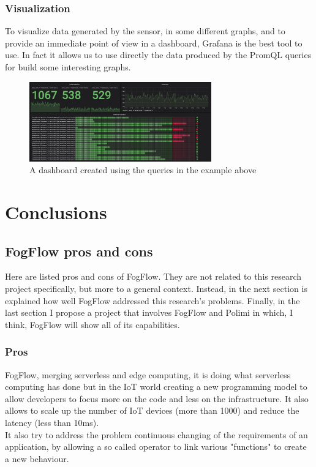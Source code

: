 \documentclass[a4paper]{article}
\begin{document}
\subsubsection{Visualization}
To visualize data generated by the sensor, in some different graphs, and to provide an immediate point of view in a dashboard, Grafana is the best tool to use.
In fact it allows us to use directly the data produced by the PromQL queries for build some interesting graphs.
\begin{figure}[H]
    \centering
    \includegraphics[width=0.7\textwidth]{Images/grafana.png}
    \caption{A dashboard created using the queries in the example above}
\end{figure}{}

\newpage
\section{Conclusions}
\subsection{FogFlow pros and cons}
Here are listed pros and cons of FogFlow. They are not related to this research project specifically, but more to a general context. Instead, in the next section is explained how well FogFlow addressed this research's problems. Finally, in the last section I propose a project that involves FogFlow and Polimi in which, I think, FogFlow will show all of its capabilities.

\subsubsection{Pros}
FogFlow, merging serverless and edge computing, it is doing what serverless computing has done but in the IoT world creating a new programming model to allow developers to focus more on the code and less on the infrastructure. It also allows to scale up the number of IoT devices (more than 1000) and reduce the latency (less than 10ms).\\
It also try to address the problem continuous changing of the requirements of an application, by allowing a so called operator to link various "functions" to create a new behaviour.
\end{document}
